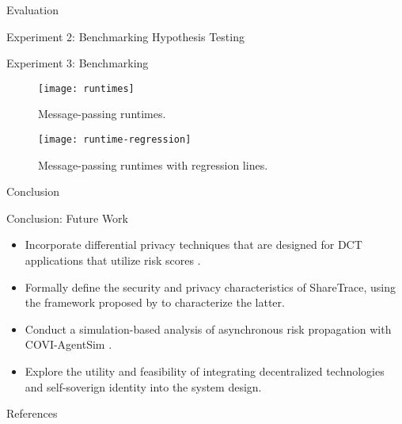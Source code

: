 \documentclass[11pt]{beamer}
\begin{document}
\begin{section}{Evaluation}
\begin{frame}{Experiment 2: Benchmarking Hypothesis Testing}
\end{frame}

\begin{frame}[allowframebreaks]{Experiment 3: Benchmarking}
\begin{figure}
  \centering
  \texttt{[image: runtimes]}
  \caption[Message-passing runtimes]{Message-passing runtimes.}
\end{figure}

\begin{figure}
  \centering
  \texttt{[image: runtime-regression]}
  \caption[Message-passing runtimes with regression lines]{Message-passing runtimes with regression lines.}
\end{figure}
\end{frame}

\end{section}

\begin{section}{Conclusion}

\begin{frame}{Conclusion: Future Work}
\begin{itemize}
  \item Incorporate differential privacy techniques that are designed for DCT applications that utilize risk scores \citep{Romijnders2024}.
  \pause
  \item Formally define the security and privacy characteristics of ShareTrace, using the framework proposed by \citet{Kuhn2021} to characterize the latter.
  \pause
  \item Conduct a simulation-based analysis of asynchronous risk propagation with COVI-AgentSim \citep{Gupta2020}.
  \pause
  \item Explore the utility and feasibility of integrating decentralized technologies \citep{Benet2014, Troncoso2017, Trautwein2022, Shi2024, Keizer2024} and self-soverign identity \citep{Preukschat2021, Schardong2022} into the system design.
\end{itemize}
\end{frame}


\end{section}

\begin{frame}[allowframebreaks]{References}
  \printbibliography
\end{frame}
\end{document}
